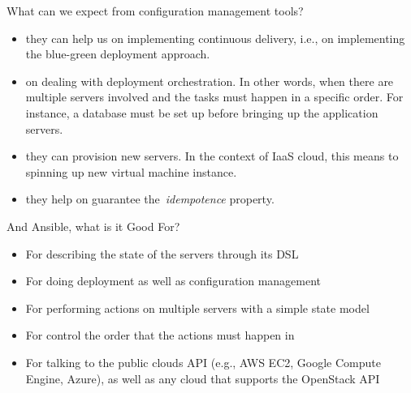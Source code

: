 \documentclass[xcolor=dvipsnames,slidestop, mathserif]{beamer}
\begin{document}
\begin{frame}{What can we expect from configuration management tools?}
   \begin{itemize}
      \item they can help us on implementing continuous delivery, i.e., on implementing the blue-green deployment approach\footnotemark.
      \item on dealing with deployment orchestration. In other words, when there are multiple servers involved and the tasks must happen in a specific order. For instance, a database must be set up before bringing up the application servers.
      \item they can provision new servers. In the context of IaaS cloud, this means to spinning up new virtual machine instance.
      \item they help on guarantee the~\textit{idempotence} property.
   \end{itemize}
\end{frame}	

\begin{frame}{And Ansible, what is it Good For?}
  \begin{itemize}
     \item For describing the state of the servers through its DSL
     \item For doing deployment as well as configuration management
     \item For performing actions on multiple servers with a simple state model
     \item For control the order that the actions must happen in
     \item For talking to the public clouds API (e.g., AWS EC2, Google Compute Engine, Azure), as well as any cloud that supports the OpenStack API
  \end{itemize}
\end{frame}
\end{document}
